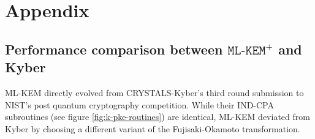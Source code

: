 \documentclass[journal=tches,submission]{iacrtrans}
\begin{document}



\section{Appendix}\label{sec:appendix}

\subsection{Performance comparison between $\texttt{ML-KEM}^+$ and Kyber}\label{sec:ml-kem-and-kyber}
ML-KEM directly evolved from CRYSTALS-Kyber's third round submission to NIST's post quantum cryptography competition. While their IND-CPA subroutines (see figure \ref{fig:k-pke-routines}) are identical, ML-KEM deviated from Kyber by choosing a different variant of the Fujisaki-Okamoto transformation.
\end{document}
